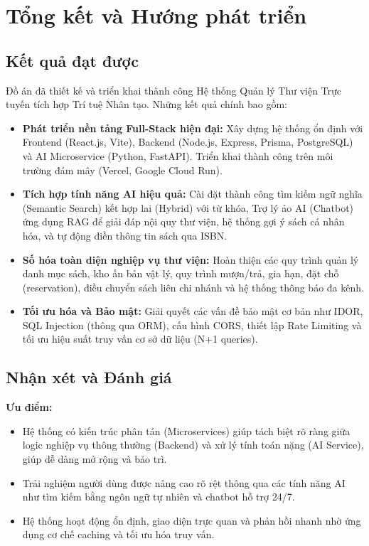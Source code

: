 \section{Tổng kết và Hướng phát triển}

\subsection{Kết quả đạt được}
Đồ án đã thiết kế và triển khai thành công Hệ thống Quản lý Thư viện Trực tuyến tích hợp Trí tuệ Nhân tạo. Những kết quả chính bao gồm:
\begin{itemize}
    \item \textbf{Phát triển nền tảng Full-Stack hiện đại:} Xây dựng hệ thống ổn định với Frontend (React.js, Vite), Backend (Node.js, Express, Prisma, PostgreSQL) và AI Microservice (Python, FastAPI). Triển khai thành công trên môi trường đám mây (Vercel, Google Cloud Run).
    \item \textbf{Tích hợp tính năng AI hiệu quả:} Cài đặt thành công tìm kiếm ngữ nghĩa (Semantic Search) kết hợp lai (Hybrid) với từ khóa, Trợ lý ảo AI (Chatbot) ứng dụng RAG để giải đáp nội quy thư viện, hệ thống gợi ý sách cá nhân hóa, và tự động điền thông tin sách qua ISBN.
    \item \textbf{Số hóa toàn diện nghiệp vụ thư viện:} Hoàn thiện các quy trình quản lý danh mục sách, kho ấn bản vật lý, quy trình mượn/trả, gia hạn, đặt chỗ (reservation), điều chuyển sách liên chi nhánh và hệ thống thông báo đa kênh.
    \item \textbf{Tối ưu hóa và Bảo mật:} Giải quyết các vấn đề bảo mật cơ bản như IDOR, SQL Injection (thông qua ORM), cấu hình CORS, thiết lập Rate Limiting và tối ưu hiệu suất truy vấn cơ sở dữ liệu (N+1 queries).
\end{itemize}

\subsection{Nhận xét và Đánh giá}
\textbf{Ưu điểm:}
\begin{itemize}
    \item Hệ thống có kiến trúc phân tán (Microservices) giúp tách biệt rõ ràng giữa logic nghiệp vụ thông thường (Backend) và xử lý tính toán nặng (AI Service), giúp dễ dàng mở rộng và bảo trì.
    \item Trải nghiệm người dùng được nâng cao rõ rệt thông qua các tính năng AI như tìm kiếm bằng ngôn ngữ tự nhiên và chatbot hỗ trợ 24/7.
    \item Hệ thống hoạt động ổn định, giao diện trực quan và phản hồi nhanh nhờ ứng dụng cơ chế caching và tối ưu hóa truy vấn.
\end{itemize}

